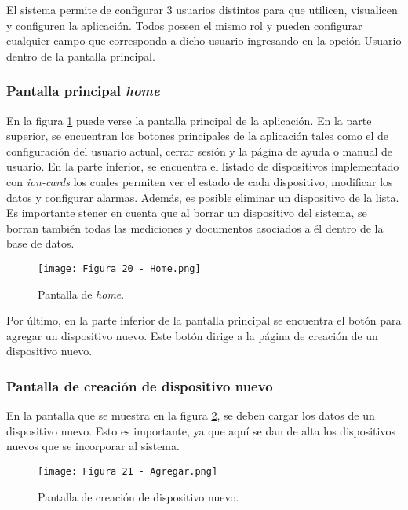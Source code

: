 El sistema permite de configurar 3 usuarios distintos para que utilicen, visualicen y configuren la aplicación. Todos poseen el mismo rol y pueden configurar cualquier campo que corresponda a dicho usuario ingresando en la opción Usuario dentro de la pantalla principal.

\subsubsection{Pantalla principal \textit{home}}

En la figura \ref{fig:20} puede verse la pantalla principal de la aplicación. En la parte superior, se encuentran los botones principales de la aplicación tales como el de configuración del usuario actual, cerrar sesión y la página de ayuda o manual de usuario. En la parte inferior, se encuentra el listado de dispositivos implementado con \textit{ion-cards} los cuales permiten ver el estado de cada dispositivo, modificar los datos y configurar alarmas. Además, es posible eliminar un dispositivo de la lista. Es importante stener en cuenta que al borrar un dispositivo del sistema, se borran también todas las mediciones y documentos asociados a él dentro de la base de datos.

\begin{figure}[h]
\centering
\texttt{[image: Figura 20 - Home.png]}
\caption[Pantalla de home]{Pantalla de \textit{home}.}
\label{fig:20}
\end{figure}

Por último, en la parte inferior de la pantalla principal se encuentra el botón para agregar un dispositivo nuevo. Este botón dirige a la página de creación de un dispositivo nuevo.

\subsubsection{Pantalla de creación de dispositivo nuevo}

En la pantalla que se muestra en la figura \ref{fig:21}, se deben cargar los datos de un dispositivo nuevo. Esto es importante, ya que aquí se dan de alta los dispositivos nuevos que se incorporar al sistema.

\begin{figure}[h]
\centering
\texttt{[image: Figura 21 - Agregar.png]}
\caption[Pantalla de creación de dispositivo nuevo]{Pantalla de creación de dispositivo nuevo.}
\label{fig:21}
\end{figure}


